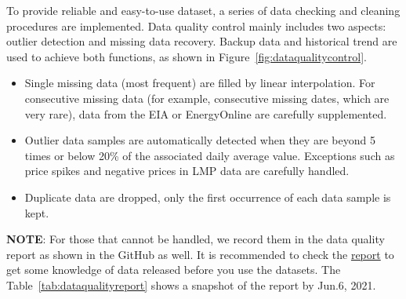 \documentclass[10pt]{article}
\numberwithin{equation}{section}
\numberwithin{table}{section}
\numberwithin{figure}{section}
\begin{document}
To provide reliable and easy-to-use dataset, a series of data checking and cleaning procedures are implemented.
Data quality control mainly includes two aspects: outlier detection and missing data recovery. Backup data and historical trend are used to achieve both functions, as shown in Figure~\ref{fig:dataqualitycontrol}.
\begin{itemize}
	\item Single missing data (most frequent) are filled by linear interpolation. For consecutive missing data (for example, consecutive missing dates, which are very rare), data from the EIA or EnergyOnline are carefully supplemented.
	\item Outlier data samples are automatically detected when they are beyond 5 times or below 20\% of the associated daily average value. Exceptions such as price spikes and negative prices in LMP data are carefully handled.
	\item Duplicate data are dropped, only the first occurrence of each data sample is kept.
\end{itemize}

\textbf{NOTE}: For those that cannot be handled, we record them in the data quality report as shown in the GitHub as well. It is recommended to check the \href{https://github.com/tamu-engineering-research/COVID-EMDA/tree/master/data_release}{report} to get some knowledge of data released before you use the datasets. The Table~\ref{tab:dataqualityreport} shows a snapshot of the report by Jun.6, 2021.
\end{document}
